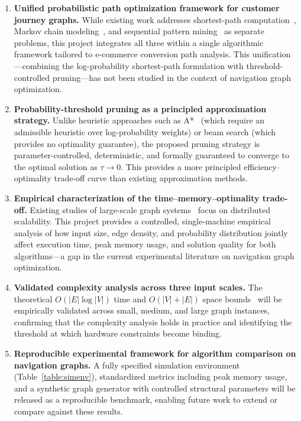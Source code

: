 \begin{enumerate}

    \item \textbf{Unified probabilistic path optimization framework for customer journey graphs.}
    While existing work addresses shortest-path computation~\citep{dijkstra1959,cormen2009}, Markov chain modeling~\citep{norris1998markov}, and sequential pattern mining~\citep{pei2001prefixspan} as separate problems, this project integrates all three within a single algorithmic framework tailored to e-commerce conversion path analysis. This unification---combining the log-probability shortest-path formulation with threshold-controlled pruning---has not been studied in the context of navigation graph optimization.

    \item \textbf{Probability-threshold pruning as a principled approximation strategy.}
    Unlike heuristic approaches such as A*~\citep{hart1968astar} (which require an admissible heuristic over log-probability weights) or beam search (which provides no optimality guarantee), the proposed pruning strategy is parameter-controlled, deterministic, and formally guaranteed to converge to the optimal solution as $\tau \to 0$. This provides a more principled efficiency--optimality trade-off curve than existing approximation methods.

    \item \textbf{Empirical characterization of the time--memory--optimality trade-off.}
    Existing studies of large-scale graph systems~\citep{malewicz2010pregel,sahu2020scaling} focus on distributed scalability. This project provides a controlled, single-machine empirical analysis of how input size, edge density, and probability distribution jointly affect execution time, peak memory usage, and solution quality for both algorithms---a gap in the current experimental literature on navigation graph optimization.

    \item \textbf{Validated complexity analysis across three input scales.}
    The theoretical $O(|E|\log|V|)$ time and $O(|V|+|E|)$ space bounds~\citep{cormen2009} will be empirically validated across small, medium, and large graph instances, confirming that the complexity analysis holds in practice and identifying the threshold at which hardware constraints become binding.

    \item \textbf{Reproducible experimental framework for algorithm comparison on navigation graphs.}
    A fully specified simulation environment (Table~\ref{table:simenv}), standardized metrics including peak memory usage, and a synthetic graph generator with controlled structural parameters will be released as a reproducible benchmark, enabling future work to extend or compare against these results.

\end{enumerate}

